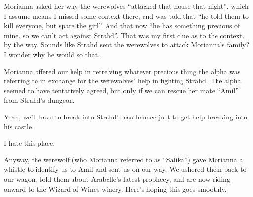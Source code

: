 Morianna asked her why the werewolves ``attacked that house that night'', which I assume means I missed some context there, and was told that ``he told them to kill everyone, but spare the girl''. And that now ``he has something precious of mine, so we can't act against Strahd''. That was my first clue as to the context, by the way. Sounds like Strahd sent the werewolves to attack Morianna's family? I wonder why he would so that.

Morianna offered our help in retreiving whatever precious thing the alpha was referring to in exchange for the werewolves' help in fighting Strahd. The alpha seemed to have tentatively agreed, but only if we can rescue her mate ``Amil'' from Strahd's dungeon.

Yeah, we'll have to break into Strahd's castle once just to get help breaking into his castle.

I hate this place.

Anyway, the werewolf (who Morianna referred to as ``Salika'') gave Morianna a whistle to identify us to Amil and sent us on our way. We ushered them back to our wagon, told them about Arabelle's latest prophecy, and are now riding onward to the Wizard of Wines winery. Here's hoping this goes smoothly.






